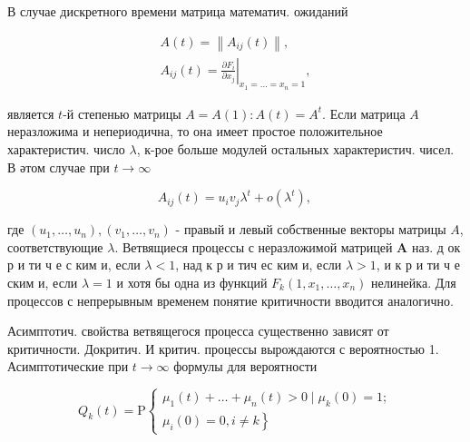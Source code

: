 \documentclass[10pt]{article}
\begin{document}
В случае дискретного времени матрица математич. ожиданий



\[

\begin{gathered}

A(t)=\left\|A_{i j}(t)\right\|, \\

A_{i j}(t)=\left.\frac{\partial F_{i}}{\partial x_{j}}\right|_{x_{1}=\ldots=x_{n}=1},

\end{gathered}

\]



является $t$-й степенью матрицы $A=A(1): A(t)=A^{t}$. Если матрица $A$ неразложима и непериодична, то она имеет простое положительное характеристич. число $\lambda$, к-рое больше модулей остальных характеристич. чисел. В әтом случае при $t \rightarrow \infty$



\[

A_{i j}(t)=u_{i} v_{j} \lambda^{t}+o\left(\lambda^{t}\right) \text {, }

\]



где $\left(u_{1}, \ldots, u_{n}\right),\left(v_{1}, \ldots, v_{n}\right)$ - правый и левый собственные векторы матрицы $A$, соответствующие $\lambda$. Ветвящиеся процессы с неразложимой матрицей $\boldsymbol{A}$ наз. д ок р и ти ч е с ким и, если $\lambda<1$, над к р и тич ес ким и, если $\lambda>1$, и к р и ти ч е ским и, если $\lambda=1$ и хотя бы одна из функций $F_{k}\left(1, x_{1}, \ldots, x_{n}\right)$ нелинейка. Для процессов с непрерывным временем понятие критичности вводится аналогично.



Асимптотич. свойства ветвящегося процесса существенно зависят от критичности. Докритич. И критич. процессы вырождаются с вероятностью 1. Асимптотические при $t \rightarrow \infty$ формулы для вероятности



\[

Q_{k}(t)=\mathrm{P}\left\{\begin{array}{c}

\mu_{1}(t)+\ldots+\mu_{n}(t)>0 \mid \mu_{k}(0)=1 ; \\

\left.\mu_{i}(0)=0, i \neq k\right\}

\end{array}\right.

\]
\end{document}
